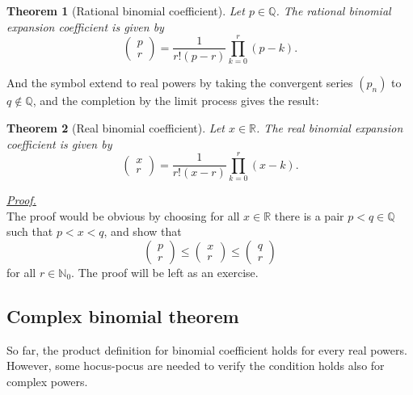 \documentclass[12pt]{article}
\newtheorem*{theorem}{Theorem}
\renewenvironment{proof}[1][Proof]{\begin{snugshade*} \underline{\textit{{#1}.}}\\}{\hfill \qedsymbol \end{snugshade*}}
\begin{document}
    \begin{theorem}[Rational binomial coefficient]
        Let $p\in\mathbb{Q}$. The rational binomial expansion coefficient is given by \[\begin{pmatrix}
            p\\r
        \end{pmatrix}=\frac{1}{r!(p-r)}\prod_{k=0}^{r}(p-k).\]
    \end{theorem}

    And the symbol extend to real powers by taking the convergent series $(p_n)$ to $q\notin\mathbb{Q}$, and the completion by the limit process gives the result:

    \begin{theorem}[Real binomial coefficient]
        Let $x\in\mathbb{R}$. The real binomial expansion coefficient is given by \[\begin{pmatrix}
            x\\r
        \end{pmatrix}=\frac{1}{r!(x-r)}\prod_{k=0}^{r}(x-k).\]
    \end{theorem}

    \begin{proof}
        The proof would be obvious by choosing for all $x\in \mathbb{R}$ there is a pair $p<q\in\mathbb{Q}$ such that $p<x<q$, and show that \[\begin{pmatrix}
            p\\r
        \end{pmatrix}\leq\begin{pmatrix}
            x\\r
        \end{pmatrix}\leq\begin{pmatrix}
            q\\r
        \end{pmatrix}\] for all $r\in \mathbb{N}_0$. The proof will be left as an exercise.
    \end{proof}

    \subsection{Complex binomial theorem}

    So far, the product definition for binomial coefficient holds for every real powers. However, some hocus-pocus are needed to verify the condition holds also for complex powers.
\end{document}
